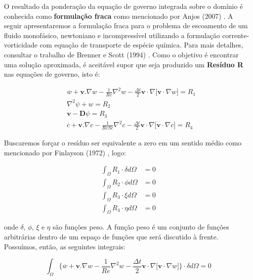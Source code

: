 O resultado da ponderação da equação de
governo integrada sobre o domínio
é conhecida como
\textbf{formulação fraca} como mencionado por Anjos (2007) \cite{anjos2007}.
A seguir apresentaremos a formulação fraca
para o problema de escoamento de um fluido monofásico,
newtoniano e incompressível utilizando
a formulação corrente-vorticidade com  
equação de transporte de espécie química.
Para mais detalhes, consultar o trabalho de Brenner e Scott (1994) \cite{brenner1994}.
Como o objetivo é encontrar uma solução
aproximada, é aceitável supor que seja produzido
um \textbf{Resíduo R} nas equações de governo,
isto é:

\begin{align}
& \overset{.}{w} + \textbf{v}.\nabla w - \frac{1}{Re} \nabla^2 w 
 - \frac{\Delta t}{2} \textbf{v} \cdot \nabla \big[ \textbf{v} \cdot \nabla w \big]
 = R_1 \\[10pt]
& \nabla^2 \psi + w
 = R_2 \\[10pt]
& \textbf{v} - \textbf{D}\psi
 = R_3 \\[10pt]
& \overset{.}{c} + \textbf{v}.\nabla c - \frac{1}{ReSc} \nabla^2 c
 - \frac{\Delta t}{2} \textbf{v} \cdot \nabla \big[ \textbf{v} \cdot \nabla c \big]
 = R_4
\end{align}

Buscaremos forçar o resíduo ser equivalente
a zero em um sentido médio como mencionado por Finlayson (1972) \cite{finlayson1972}, logo:

\begin{align}
 \int_{\Omega} R_1 \cdot \delta d\Omega &= 0 \\
 \int_{\Omega} R_2 \cdot \phi d\Omega &= 0 \\
 \int_{\Omega} R_3 \cdot \xi d\Omega &= 0 \\
 \int_{\Omega} R_4 \cdot \eta d\Omega &= 0
\end{align}



\noindent
onde $\delta$, $\phi$, $\xi$ e $\eta$ são funções peso. A função peso
é um conjunto de funções arbitrárias
dentro de um espaço de funções que será
discutido à frente. Possuímos, então,
as seguintes integrais:

\begin{equation}
 \int_{\Omega} \Bigg\{ 
 \overset{.}{w} + \textbf{v}.\nabla w 
 - \frac{1}{\textit{Re}} \nabla^2 w 
 - \frac{\Delta t}{2} \textbf{v} \cdot \nabla \big[ \textbf{v} \cdot \nabla w \big]
\Bigg\} \cdot \delta d\Omega = 0
\end{equation}

